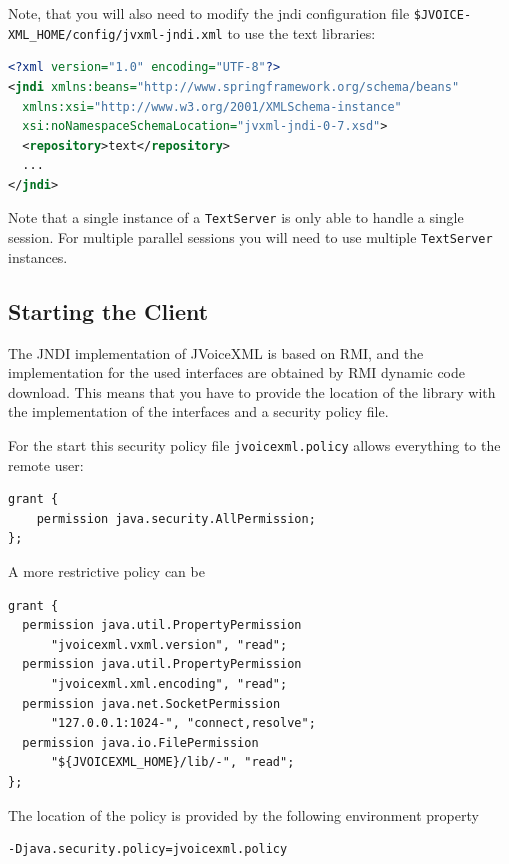 \documentclass[11pt,a4paper]{book}
\begin{document}
Note, that you will also need to modify the jndi configuration file
\texttt{\${JVOICE-} \texttt{XML\_HOME}/config/jvxml-jndi.xml} to use the text
libraries:

\begin{lstlisting}[language=XML]
<?xml version="1.0" encoding="UTF-8"?>
<jndi xmlns:beans="http://www.springframework.org/schema/beans"
  xmlns:xsi="http://www.w3.org/2001/XMLSchema-instance"
  xsi:noNamespaceSchemaLocation="jvxml-jndi-0-7.xsd">
  <repository>text</repository>
  ...
</jndi>
\end{lstlisting}

Note that a single instance of a \lstinline{TextServer} is only able to handle
a single session. For multiple parallel sessions you will need to use multiple 
\lstinline{TextServer} instances.

\subsection{Starting the Client}
\label{sec:starting-client}

The JNDI implementation of JVoiceXML is based on RMI, and
the implementation for the used interfaces are obtained by
RMI dynamic code download. This means that you have to provide
the location of the library with the implementation of the
interfaces and a security policy file.

For the start this security policy file \texttt{jvoicexml.policy}
allows everything to the remote user:

\begin{lstlisting}
grant {
    permission java.security.AllPermission;
};
\end{lstlisting}

A more restrictive policy can be

\begin{lstlisting}
grant {
  permission java.util.PropertyPermission
      "jvoicexml.vxml.version", "read";
  permission java.util.PropertyPermission
      "jvoicexml.xml.encoding", "read";
  permission java.net.SocketPermission
      "127.0.0.1:1024-", "connect,resolve";
  permission java.io.FilePermission
      "${JVOICEXML_HOME}/lib/-", "read";
};
\end{lstlisting}

The location of the policy is provided by the following environment property

\begin{lstlisting}
-Djava.security.policy=jvoicexml.policy
\end{lstlisting}
\end{document}

